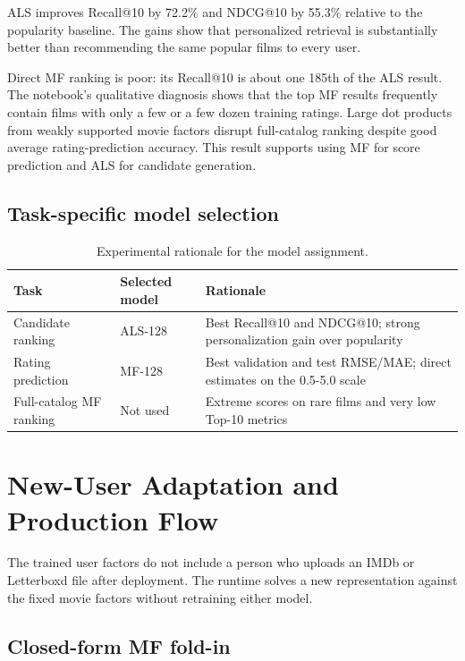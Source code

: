 \documentclass[11pt,a4paper]{article}
\begin{document}
ALS improves Recall@10 by 72.2\% and NDCG@10 by 55.3\% relative to the popularity baseline. The gains show that personalized retrieval is substantially better than recommending the same popular films to every user.

Direct MF ranking is poor: its Recall@10 is about one 185th of the ALS result. The notebook's qualitative diagnosis shows that the top MF results frequently contain films with only a few or a few dozen training ratings. Large dot products from weakly supported movie factors disrupt full-catalog ranking despite good average rating-prediction accuracy. This result supports using MF for score prediction and ALS for candidate generation.

\subsection{Task-specific model selection}

\begin{table}[H]
\centering
\caption{Experimental rationale for the model assignment.}
\begin{tabularx}{\textwidth}{@{}p{28mm}YY@{}}
\toprule
\textbf{Task} & \textbf{Selected model} & \textbf{Rationale} \\
\midrule
Candidate ranking & ALS-128 & Best Recall@10 and NDCG@10; strong personalization gain over popularity \\
Rating prediction & MF-128 & Best validation and test RMSE/MAE; direct estimates on the 0.5-5.0 scale \\
Full-catalog MF ranking & Not used & Extreme scores on rare films and very low Top-10 metrics \\
\bottomrule
\end{tabularx}
\end{table}

\section{New-User Adaptation and Production Flow}
\label{sec:serving}

The trained user factors do not include a person who uploads an IMDb or Letterboxd file after deployment. The runtime solves a new representation against the fixed movie factors without retraining either model.

\subsection{Closed-form MF fold-in}
\end{document}
